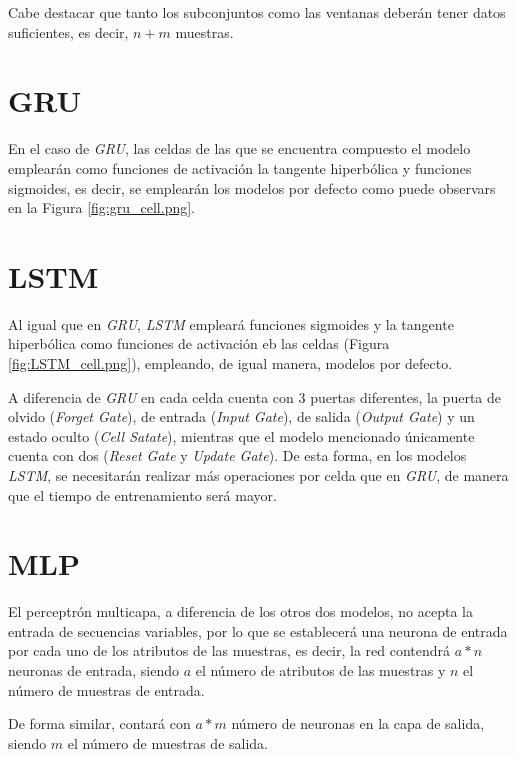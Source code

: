 Cabe destacar que tanto los subconjuntos como las ventanas deberán tener datos 
suficientes, es decir, \(n + m\) muestras.

\newpage

\section{GRU}
En el caso de \textit{GRU}, las celdas de las que se encuentra compuesto el modelo 
emplearán como funciones de activación la tangente hiperbólica y funciones sigmoides, 
es decir, se emplearán los modelos por defecto como puede observars en la Figura 
\ref{fig:gru_cell.png}.


\section{LSTM}
Al igual que en \textit{GRU}, \textit{LSTM} empleará funciones sigmoides y la 
tangente hiperbólica como funciones de activación eb las celdas (Figura \ref{fig:LSTM_cell.png}),
empleando, de igual manera, modelos por defecto.


A diferencia de \textit{GRU} en cada celda cuenta con 3 puertas diferentes, 
la puerta de olvido (\textit{Forget Gate}), de entrada (\textit{Input Gate}), 
de salida (\textit{Output Gate}) y un estado oculto (\textit{Cell Satate}), mientras que 
el modelo mencionado únicamente cuenta con dos (\textit{Reset Gate} y \textit{Update Gate}).
De esta forma, en los modelos \textit{LSTM}, se necesitarán realizar más operaciones
por celda que en \textit{GRU}, de manera que el tiempo de entrenamiento será mayor.


\section{MLP}
El perceptrón multicapa, a diferencia de los otros dos modelos, no acepta
la entrada de secuencias variables, por lo que se establecerá una neurona de entrada
por cada uno de los atributos de las muestras, es decir, la red contendrá
\(a * n\) neuronas de entrada, siendo \(a\) el número de atributos de las muestras y
\(n\) el número de muestras de entrada.

De forma similar, contará con \(a * m\) número de neuronas en la capa de salida, siendo
\(m\) el número de muestras de salida.

